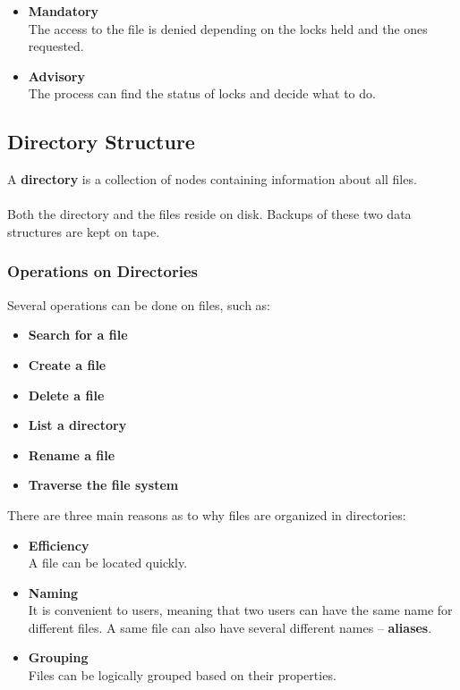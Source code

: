 \documentclass{article}
\begin{document}
\begin{itemize}
	\item \textbf{Mandatory}
	\vspace{.2cm} \\
	The access to the file is denied depending on the locks held and the ones requested.
	
	\item \textbf{Advisory}
	\vspace{.2cm} \\
	The process can find the status of locks and decide what to do.
\end{itemize}

\subsection{Directory Structure}
A \textbf{directory} is a collection of nodes containing information about all files. \\ \\
Both the directory and the files reside on disk. Backups of these two data structures are kept on tape.

\subsubsection{Operations on Directories}
Several operations can be done on files, such as:

\begin{itemize}
	\item \textbf{Search for a file}
	\item \textbf{Create a file}
	\item \textbf{Delete a file}
	\item \textbf{List a directory}
	\item \textbf{Rename a file}
	\item \textbf{Traverse the file system}
\end{itemize}
There are three main reasons as to why files are organized in directories:

\begin{itemize}
	\item \textbf{Efficiency}
	\vspace{.2cm} \\
	A file can be located quickly.
	
	\item \textbf{Naming}
	\vspace{.2cm} \\
	It is convenient to users, meaning that two users can have the same name for different files. A same file can also have several different names -- \textbf{aliases}.
	
	\item \textbf{Grouping}
	\vspace{.2cm} \\
	Files can be logically grouped based on their properties.
\end{itemize}
\end{document}
